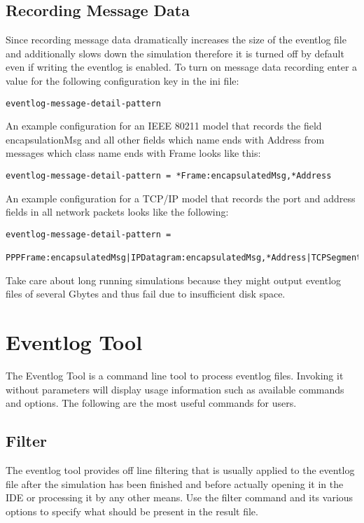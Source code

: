 \subsection{Recording Message Data}
Since recording message data dramatically increases the size of the eventlog file and
additionally slows down the simulation therefore it is turned off by default even if
writing the eventlog is enabled. To turn on message data recording enter a value for the
following configuration key in the ini file:
\begin{verbatim}
eventlog-message-detail-pattern
\end{verbatim}
An example configuration for an IEEE 80211 model that records the field encapsulationMsg
and all other fields which name ends with Address from messages which class name ends with
Frame looks like this:
\begin{verbatim}
eventlog-message-detail-pattern = *Frame:encapsulatedMsg,*Address
\end{verbatim}
An example configuration for a TCP/IP model that records the port and address fields in
all network packets looks like the following:
\begin{verbatim}
eventlog-message-detail-pattern =
 PPPFrame:encapsulatedMsg|IPDatagram:encapsulatedMsg,*Address|TCPSegment:*Port
\end{verbatim}
\begin{note}
Take care about long running simulations because they might output eventlog files of
several Gbytes and thus fail due to insufficient disk space.
\end{note}

\section{Eventlog Tool}
The Eventlog Tool is a command line tool to process eventlog files. Invoking it without
parameters will display usage information such as available commands and options. The
following are the most useful commands for users.

\subsection{Filter}
The eventlog tool provides off line filtering that is usually applied to the eventlog file
after the simulation has been finished and before actually opening it in the {\opp} IDE
or processing it by any other means. Use the filter command and its various options to
specify what should be present in the result file.

